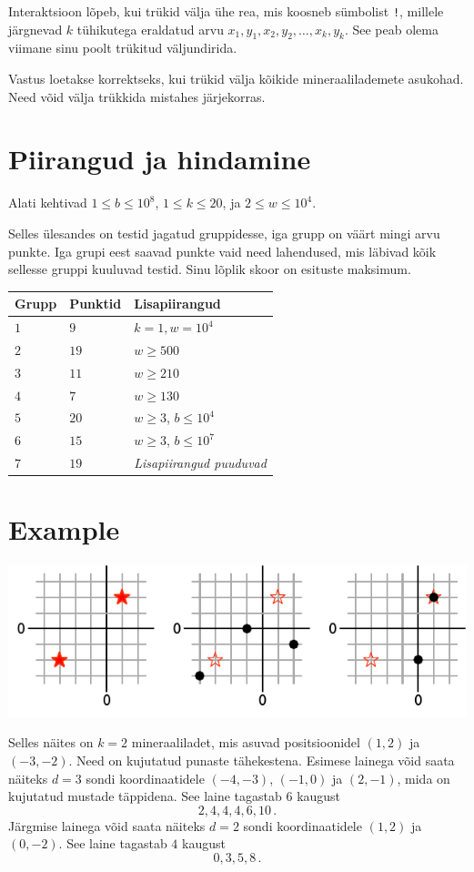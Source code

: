 Interaktsioon lõpeb, kui trükid välja ühe rea, mis koosneb sümbolist \texttt{!}, millele järgnevad $k$ tühikutega eraldatud arvu $x_1, y_1, x_2, y_2, \ldots, x_k, y_k$.
See peab olema viimane sinu poolt trükitud väljundirida.

Vastus loetakse korrektseks, kui trükid välja kõikide mineraalilademete asukohad.
Need võid välja trükkida mistahes järjekorras.

\section*{Piirangud ja hindamine}

Alati kehtivad
$1\leq b \leq 10^8$, %
$1 \leq k \leq 20$, %
ja
$2 \le w \le 10^4$. %

Selles ülesandes on testid jagatud gruppidesse, iga grupp on väärt mingi arvu punkte.
Iga grupi eest saavad punkte vaid need lahendused, mis läbivad kõik sellesse gruppi kuuluvad testid.
Sinu lõplik skoor on esituste maksimum.

\medskip
\begin{tabular}{lll}
Grupp & Punktid & Lisapiirangud \\\hline
  $1$ & $9$ & $k = 1, w = 10^4$\\
  $2$ & $19$ & $w \ge 500$\\
  $3$ & $11$ & $w \ge 210$\\
  $4$ & $7$ & $w \ge 130$\\
  $5$ & $20$ & $w \ge 3$, $b \le 10^4$\\
  $6$ & $15$ & $w \ge 3$, $b \le 10^7$\\
  $7$ & $19$ & \emph{Lisapiirangud puuduvad}
\end{tabular}

\section*{Example}

\includegraphics[width=.6\textwidth]{img/sample1.pdf}

Selles näites on $k=2$ mineraaliladet, mis asuvad positsioonidel $(1,2)$ ja $(-3,-2)$. Need on kujutatud punaste tähekestena.
Esimese lainega võid saata näiteks $d=3$ sondi koordinaatidele $(-4,-3)$, $(-1, 0)$ ja $(2,-1)$, mida on kujutatud mustade täppidena.
See laine tagastab $6$ kaugust \[
  2, 4, 4, 4, 6, 10\,.
\]
Järgmise lainega võid saata näiteks $d=2$ sondi koordinaatidele $(1,2)$ ja $(0,-2)$.
See laine tagastab $4$ kaugust \[
  0, 3, 5, 8\,.
\]
